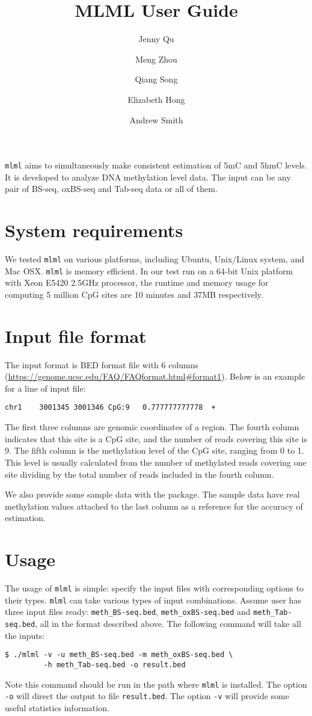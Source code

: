 \documentclass[11pt]{article}
\title{MLML User Guide}
\author{Jenny Qu \and Meng Zhou \and Qiang Song \and Elizabeth Hong \and Andrew Smith}
\newcommand{\prog}[1]{\texttt{#1}}
\newcommand{\fn}[1]{\texttt{#1}}
\newcommand{\op}[1]{\texttt{#1}}
\begin{document}
\maketitle

\prog{mlml} aims to simultaneously make consistent estimation of 5mC and 5hmC levels. It is developed to analyze DNA methylation level data. The input can be any pair of BS-seq, oxBS-seq and Tab-seq data or all of them.

\section{System requirements}
We tested \prog{mlml} on various platforms, including Ubuntu, Unix/Linux system, and Mac OSX. \prog{mlml} is memory efficient. In our test run on a 64-bit Unix platform with Xeon E5420 2.5GHz processor, the runtime and memory usage for computing 5 million CpG sites are 10 minutes and 37MB respectively.

\section{Input file format}
The input format is BED format file with 6 columns (\url{https://genome.ucsc.edu/FAQ/FAQformat.html\#format1}). Below is an example for a line of input file:
\begin{verbatim}
chr1    3001345 3001346 CpG:9   0.777777777778  +
\end{verbatim}

\noindent
The first three columns are genomic coordinates of a region. The fourth column indicates that this site is a CpG site, and the number of reads covering this site is 9. The fifth column is the methylation level of the CpG site, ranging from 0 to 1. This level is usually calculated from the number of methylated reads covering one site dividing by the total number of reads included in the fourth column.

We also provide some sample data with the package. The sample data have real methylation values attached to the last column as a reference for the accuracy of estimation.

\section{Usage}
The usage of \prog{mlml} is simple: specify the input files with corresponding options to their types. \prog{mlml} can take various types of input combinations. Assume user has three input files ready: \fn{meth\_BS-seq.bed}, \fn{meth\_oxBS-seq.bed} and \fn{meth\_Tab-seq.bed}, all in the format described above. The following command will take all the inputs:
\begin{verbatim}
$ ./mlml -v -u meth_BS-seq.bed -m meth_oxBS-seq.bed \
         -h meth_Tab-seq.bed -o result.bed
\end{verbatim}
Note this command should be run in the path where \prog{mlml} is installed. The option \op{-o} will direct the output to file \fn{result.bed}. The option \op{-v} will provide some useful statistics information.
\end{document}
